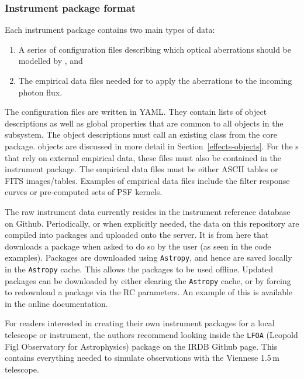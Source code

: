 \subsubsection{Instrument package format}
\label{instrument-package-format}

Each instrument package contains two main types of data:
\begin{enumerate}
\item A series of configuration files describing which optical aberrations should be modelled by \scopesim{}, and

\item The empirical data files needed for \scopesim{} to apply the aberrations to the incoming photon flux.
\end{enumerate}

The configuration files are written in YAML.
They contain lists of \Effect{} object descriptions as well as global properties that are common to all \Effect{} objects in the subsystem.
The \Effect{} object descriptions must call an existing \Effect{} class from the \ScopeSim{} core package.
\Effect{} objects are discussed in more detail in Section~\ref{effects-objects}.
For the \Effect{}s that rely on external empirical data, these files must also be contained in the instrument package.
The empirical data files must be either ASCII tables or FITS images/tables.
Examples of empirical data files include the filter response curves or pre-computed sets of PSF kernels.

The raw instrument data currently resides in the instrument reference database on Github.
Periodically, or when explicitly needed, the data on this repository are compiled into packages and uploaded onto the \ScopeSim{} server.
It is from here that \ScopeSim{} downloads a package when asked to do so by the user (as seen in the code examples).
Packages are downloaded using \lstinline{Astropy}, and hence are saved locally in the \lstinline{Astropy} cache.
This allows the packages to be used offline.
Updated packages can be downloaded by either clearing the \lstinline{Astropy} cache, or by forcing \scopesim{} to redownload a package via the RC parameters.
An example of this is available in the online documentation.

For readers interested in creating their own instrument packages for a local telescope or instrument, the authors recommend looking inside the \lstinline{LFOA} (Leopold Figl Observatory for Astrophysics) package on the IRDB Github page.
This contains everything needed to simulate observations with the Viennese 1.5\,m telescope.



